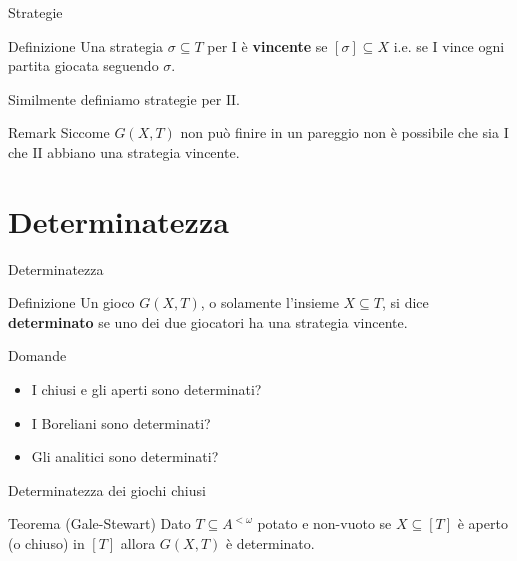 \documentclass[aspectratio=43]{beamer}
\begin{document}
\begin{frame}{Strategie}
  \begin{block}{Definizione}
    Una strategia \(\sigma \subseteq T\) per \(\mathrm{I}\) è \textbf{vincente} se \([\sigma] \subseteq X\) i.e. se \(\mathrm{I}\) vince ogni partita giocata seguendo \(\sigma\).
  \end{block}
  \pause
  Similmente definiamo strategie per \(\mathrm{II}\).
  \pause
  \begin{block}{Remark}
    Siccome \(G(X, T)\) non può finire in un pareggio non è possibile che sia \(\mathrm{I}\) che \(\mathrm{II}\) abbiano una strategia vincente.
  \end{block}
\end{frame}

\section{Determinatezza}

\begin{frame}{Determinatezza}
  \begin{block}{Definizione}
    Un gioco \(G(X, T)\), o solamente l'insieme \(X \subseteq T\), si dice \textbf{determinato} se uno dei due giocatori ha una strategia vincente.
  \end{block}
  \pause
  \begin{block}{Domande}
    \begin{itemize}
    \item I chiusi e gli aperti sono determinati?
    \item I Boreliani sono determinati?
    \item Gli analitici sono determinati?
    \end{itemize}
  \end{block}
\end{frame}

\begin{frame}{Determinatezza dei giochi chiusi}
  \begin{block}{Teorema (Gale-Stewart)}
    Dato \(T \subseteq A^{<\omega}\) potato e non-vuoto se \(X \subseteq [T]\) è aperto (o chiuso) in \([T]\) allora \(G(X, T)\) è determinato.
  \end{block}
\end{frame}
\end{document}
